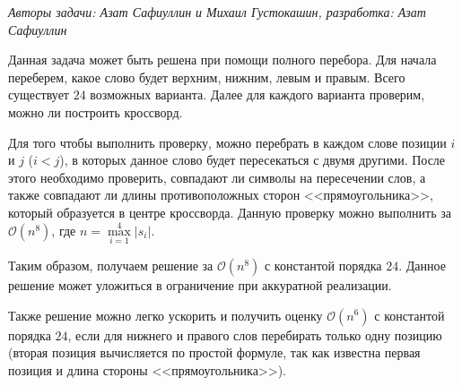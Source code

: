 \medskip
\textit{Авторы задачи: Азат Сафиуллин и Михаил Густокашин, разработка: Азат Сафиуллин}
\medskip

Данная задача может быть решена при помощи полного перебора. Для начала переберем, какое слово будет верхним, нижним, левым и правым. Всего существует $24$ возможных варианта. Далее для каждого варианта проверим, можно ли построить кроссворд.

Для того чтобы выполнить проверку, можно перебрать в каждом слове позиции $i$ и $j$ ($i < j$), в которых данное слово будет пересекаться с двумя другими. После этого необходимо проверить, совпадают ли символы на пересечении слов, а также совпадают ли длины противоположных сторон <<прямоугольника>>, который образуется в центре кроссворда. Данную проверку можно выполнить за $\mathcal{O}(n^8)$, где $n = \max\limits_{i=1}^{4} \lvert s_i \rvert$.

Таким образом, получаем решение за $\mathcal{O}(n^8)$ с константой порядка $24$. Данное решение может уложиться в ограничение при аккуратной реализации.

Также решение можно легко ускорить и получить оценку $\mathcal{O}(n^6)$ с константой порядка $24$, если для нижнего и правого слов перебирать только одну позицию (вторая позиция вычисляется по простой формуле, так как известна первая позиция и длина стороны <<прямоугольника>>).
